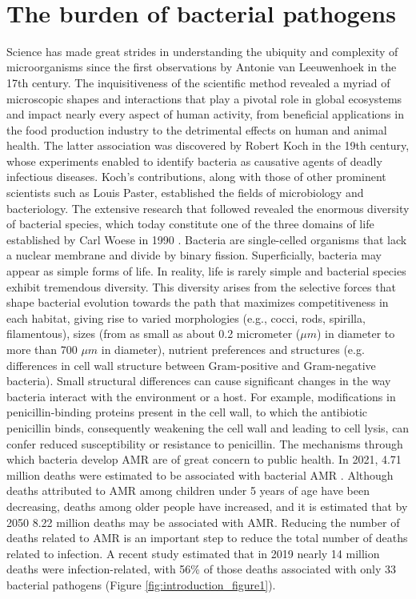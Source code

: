 \renewcommand*{\thefootnote}{\arabic{footnote}}

\mbox{}\\
\vspace{8cm}

\section{The burden of bacterial pathogens}

Science has made great strides in understanding the ubiquity and complexity of microorganisms since the first observations by Antonie van Leeuwenhoek in the 17th century. The inquisitiveness of the scientific method revealed a myriad of microscopic shapes and interactions that play a pivotal role in global ecosystems and impact nearly every aspect of human activity, from beneficial applications in the food production industry to the detrimental effects on human and animal health. The latter association was discovered by Robert Koch in the 19th century, whose experiments enabled to identify bacteria as causative agents of deadly infectious diseases. Koch’s contributions, along with those of other prominent scientists such as Louis Paster, established the fields of microbiology and bacteriology. The extensive research that followed revealed the enormous diversity of bacterial species, which today constitute one of the three domains of life established by Carl Woese in 1990 \cite{woese_towards_1990}.
Bacteria are single-celled organisms that lack a nuclear membrane and divide by binary fission. Superficially, bacteria may appear as simple forms of life. In reality, life is rarely simple and bacterial species exhibit tremendous diversity. This diversity arises from the selective forces that shape bacterial evolution towards the path that maximizes competitiveness in each habitat, giving rise to varied morphologies (e.g., cocci, rods, spirilla, filamentous), sizes (from as small as about 0.2 micrometer ($\mu m$) in diameter to more than 700 $\mu m$ in diameter), nutrient preferences and structures (e.g. differences in cell wall structure between Gram-positive and Gram-negative bacteria).
Small structural differences can cause significant changes in the way bacteria interact with the environment or a host. For example, modifications in penicillin-binding proteins present in the cell wall, to which the antibiotic penicillin binds, consequently weakening the cell wall and leading to cell lysis, can confer reduced susceptibility or resistance to penicillin. The mechanisms through which bacteria develop \ac{AMR} are of great concern to public health. In 2021, 4.71 million deaths were estimated to be associated with bacterial \ac{AMR} \cite{naghavi_global_2024}. Although deaths attributed to \ac{AMR} among children under 5 years of age have been decreasing, deaths among older people have increased, and it is estimated that by 2050 8.22 million deaths may be associated with \ac{AMR}. Reducing the number of deaths related to \ac{AMR} is an important step to reduce the total number of deaths related to infection. A recent study estimated that in 2019 nearly 14 million deaths were infection-related, with 56\% of those deaths associated with only 33 bacterial pathogens (Figure \ref{fig:introduction_figure1}).

